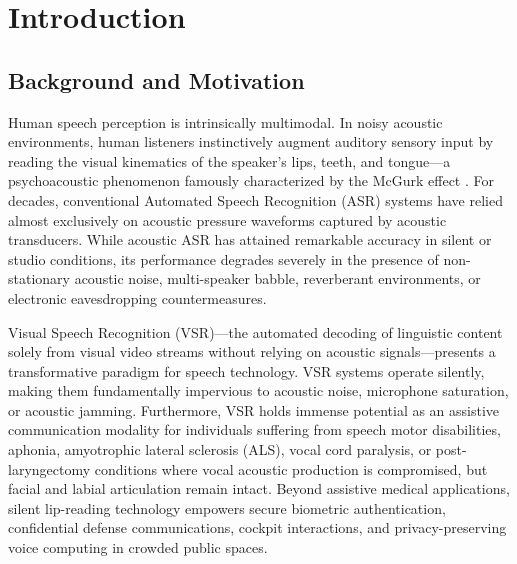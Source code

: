 \documentclass[conference,compsoc,10pt]{IEEEtran}
\begin{document}
\section{Introduction}

\subsection{Background and Motivation}
Human speech perception is intrinsically multimodal. In noisy acoustic environments, human listeners instinctively augment auditory sensory input by reading the visual kinematics of the speaker's lips, teeth, and tongue---a psychoacoustic phenomenon famously characterized by the McGurk effect \cite{mcgurk}. For decades, conventional Automated Speech Recognition (ASR) systems have relied almost exclusively on acoustic pressure waveforms captured by acoustic transducers. While acoustic ASR has attained remarkable accuracy in silent or studio conditions, its performance degrades severely in the presence of non-stationary acoustic noise, multi-speaker babble, reverberant environments, or electronic eavesdropping countermeasures.

Visual Speech Recognition (VSR)---the automated decoding of linguistic content solely from visual video streams without relying on acoustic signals---presents a transformative paradigm for speech technology. VSR systems operate silently, making them fundamentally impervious to acoustic noise, microphone saturation, or acoustic jamming. Furthermore, VSR holds immense potential as an assistive communication modality for individuals suffering from speech motor disabilities, aphonia, amyotrophic lateral sclerosis (ALS), vocal cord paralysis, or post-laryngectomy conditions where vocal acoustic production is compromised, but facial and labial articulation remain intact. Beyond assistive medical applications, silent lip-reading technology empowers secure biometric authentication, confidential defense communications, cockpit interactions, and privacy-preserving voice computing in crowded public spaces.
\end{document}
